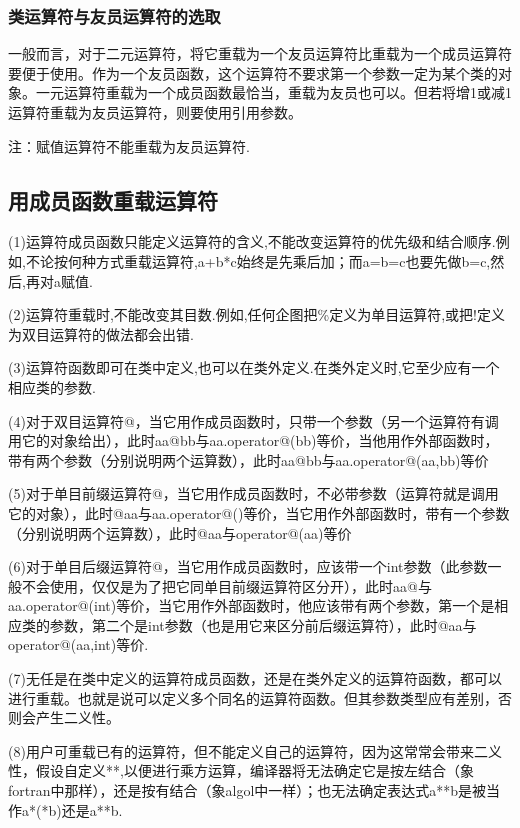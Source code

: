 \documentclass{article}
\begin{document}
\subsubsection{类运算符与友员运算符的选取}
\label{sec-9-1-2}

一般而言，对于二元运算符，将它重载为一个友员运算符比重载为一个成员运算符要便于使用。作为一个友员函数，这个运算符不要求第一个参数一定为某个类的对象。一元运算符重载为一个成员函数最恰当，重载为友员也可以。但若将增1或减1运算符重载为友员运算符，则要使用引用参数。

注：赋值运算符不能重载为友员运算符. 

\subsection{用成员函数重载运算符}
\label{sec-9-2}
(1)运算符成员函数只能定义运算符的含义,不能改变运算符的优先级和结合顺序.例如,不论按何种方式重载运算符,a+b*c始终是先乘后加；而a=b=c也要先做b=c,然后,再对a赋值.

(2)运算符重载时,不能改变其目数.例如,任何企图把\%定义为单目运算符,或把!定义为双目运算符的做法都会出错.

(3)运算符函数即可在类中定义,也可以在类外定义.在类外定义时,它至少应有一个相应类的参数.

(4)对于双目运算符@，当它用作成员函数时，只带一个参数（另一个运算符有调用它的对象给出），此时aa@bb与aa.operator@(bb)等价，当他用作外部函数时，带有两个参数（分别说明两个运算数），此时aa@bb与aa.operator@(aa,bb)等价

(5)对于单目前缀运算符@，当它用作成员函数时，不必带参数（运算符就是调用它的对象），此时@aa与aa.operator@()等价，当它用作外部函数时，带有一个参数（分别说明两个运算数），此时@aa与operator@(aa)等价

(6)对于单目后缀运算符@，当它用作成员函数时，应该带一个int参数（此参数一般不会使用，仅仅是为了把它同单目前缀运算符区分开），此时aa@与aa.operator@(int)等价，当它用作外部函数时，他应该带有两个参数，第一个是相应类的参数，第二个是int参数（也是用它来区分前后缀运算符），此时@aa与operator@(aa,int)等价.

(7)无任是在类中定义的运算符成员函数，还是在类外定义的运算符函数，都可以进行重载。也就是说可以定义多个同名的运算符函数。但其参数类型应有差别，否则会产生二义性。

(8)用户可重载已有的运算符，但不能定义自己的运算符，因为这常常会带来二义性，假设自定义**,以便进行乘方运算，编译器将无法确定它是按左结合（象fortran中那样），还是按有结合（象algol中一样）；也无法确定表达式a**b是被当作a*(*b)还是a**b.
\end{document}
